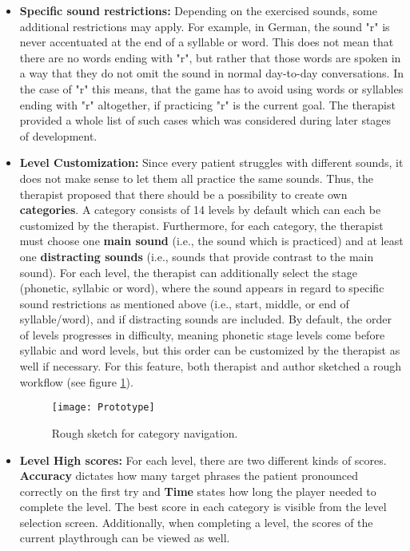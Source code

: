\documentclass[draft,final]{vutinfth} %
\begin{document}
\begin{itemize}
\item \textbf{Specific sound restrictions:} Depending on the exercised sounds, some additional restrictions may apply. For example, in German, the sound "r" is never accentuated at the end of a syllable or word. This does not mean that there are no words ending with "r", but rather that those words are spoken in a way that they do not omit the sound in normal day-to-day conversations. In the case of "r" this means, that the game has to avoid using words or syllables ending with "r" altogether, if practicing "r" is the current goal. The therapist provided a whole list of such cases which was considered during later stages of development.
\item \textbf{Level Customization:} Since every patient struggles with different sounds, it does not make sense to let them all practice the same sounds. Thus, the therapist proposed that there should be a possibility to create own \textbf{categories}. A category consists of 14 levels by default which can each be customized by the therapist. Furthermore, for each category, the therapist must choose one \textbf{main sound} (i.e., the sound which is practiced) and at least one \textbf{distracting sounds} (i.e., sounds that provide contrast to the main sound). For each level, the therapist can additionally select the stage (phonetic, syllabic or word), where the sound appears in regard to specific sound restrictions as mentioned above (i.e., start, middle, or end of syllable/word), and if distracting sounds are included. By default, the order of levels progresses in difficulty, meaning phonetic stage levels come before syllabic and word levels, but this order can be customized by the therapist as well if necessary. For this feature, both therapist and author sketched a rough workflow (see figure \ref{fig:prototype}).
\begin{figure}
\begin{center}
\texttt{[image: Prototype]}
\end{center}
\caption{Rough sketch for category navigation.}
\label{fig:prototype}
\end{figure}
\item \textbf{Level High scores:} For each level, there are two different kinds of scores. \textbf{Accuracy} dictates how many target phrases the patient pronounced correctly on the first try and \textbf{Time} states how long the player needed to complete the level. The best score in each category is visible from the level selection screen. Additionally, when completing a level, the scores of the current playthrough can be viewed as well.

\end{itemize}
\end{document}
